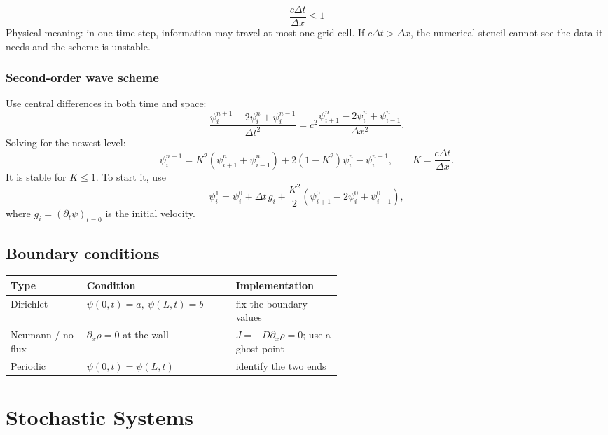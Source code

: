 \documentclass[10.5pt,a4paper]{article}
\begin{document}
\begin{keybox}
\[
\boxed{\;\frac{c\Delta t}{\Delta x}\le1\;}
\]
Physical meaning: in one time step, information may travel at most one
grid cell. If \(c\Delta t>\Delta x\), the numerical stencil cannot see
the data it needs and the scheme is unstable.
\end{keybox}

\subsubsection*{Second-order wave scheme}

Use central differences in both time and space:
\[
\frac{\psi_i^{n+1}-2\psi_i^n+\psi_i^{n-1}}{\Delta t^2}
=c^2\frac{\psi_{i+1}^n-2\psi_i^n+\psi_{i-1}^n}{\Delta x^2}.
\]
Solving for the newest level:
\[
\psi_i^{n+1}
=K^2\left(\psi_{i+1}^n+\psi_{i-1}^n\right)
+2(1-K^2)\psi_i^n-\psi_i^{n-1},
\qquad
K=\frac{c\Delta t}{\Delta x}.
\]
It is stable for \(K\le1\). To start it, use
\[
\psi_i^1=\psi_i^0+\Delta t\,g_i
+\frac{K^2}{2}\left(\psi_{i+1}^0-2\psi_i^0+\psi_{i-1}^0\right),
\]
where \(g_i=(\partial_t\psi)_{t=0}\) is the initial velocity.

\subsection{Boundary conditions}

\begin{center}
\begin{tabularx}{\linewidth}{@{}>{\raggedright\arraybackslash}p{0.23\linewidth}
  >{\raggedright\arraybackslash}X
  >{\raggedright\arraybackslash}p{0.32\linewidth}@{}}
\toprule
\rowcolor{accent!10}
\textbf{Type} & \textbf{Condition} & \textbf{Implementation} \\
\midrule
Dirichlet & \(\psi(0,t)=a,\ \psi(L,t)=b\) & fix the boundary values \\
Neumann / no-flux & \(\partial_x\rho=0\) at the wall & \(J=-D\partial_x\rho=0\); use a ghost point \\
Periodic & \(\psi(0,t)=\psi(L,t)\) & identify the two ends \\
\bottomrule
\end{tabularx}
\end{center}

\clearpage
{}
\section{Stochastic Systems}
\end{document}
